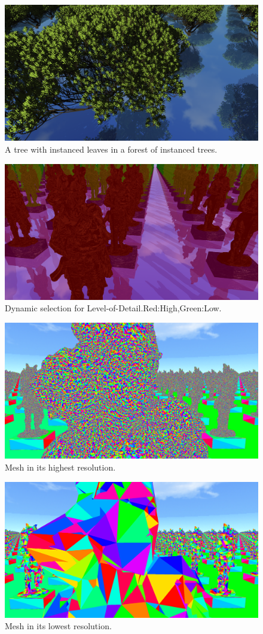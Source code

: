 \begin{figure}
    \centering
    \includegraphics[width=.7\textwidth]{images/preview/Tree.PNG}
    \caption{A tree with instanced leaves in a forest of instanced trees.}
    \label{fig:preview-pic1}
\end{figure}

\begin{figure}
    \centering
    \includegraphics[width=.7\textwidth]{images/preview/LOD-Select.PNG}
    \caption{Dynamic selection for Level-of-Detail.Red:High,Green:Low.}
    \label{fig:preview-pic2}
\end{figure}

\begin{figure}
    \centering
    \includegraphics[width=.7\textwidth]{images/preview/LOD-Max.PNG}
    \caption{Mesh in its highest resolution.}
    \label{fig:preview-pic6}
\end{figure}

\begin{figure}
    \centering
    \includegraphics[width=.7\textwidth]{images/preview/LOD-Min.PNG}
    \caption{Mesh in its lowest resolution.}
    \label{fig:preview-pic8}
\end{figure}

